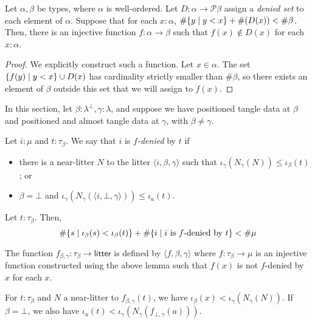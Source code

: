 \documentclass{article}
\begin{document}
\begin{lemma}
    Let \( \alpha, \beta \) be types, where \( \alpha \) is well-ordered.
    Let \( D \colon \alpha \to \mathcal P \beta \) assign a \emph{denied set} to each element of \( \alpha \).
    Suppose that for each \( x : \alpha \), \( \#\qty{y \mid y < x} + \#(D (x)) < \#\beta \).
    Then, there is an injective function \( f \colon \alpha \to \beta \) such that \( f(x) \not\in D(x) \) for each \( x : \alpha \).
\end{lemma}
\begin{proof}
    We explicitly construct such a function.
    Let \( x \in \alpha \).
    The set \( \qty{f(y) \mid y < x} \cup D(x) \) has cardinality strictly smaller than \( \#\beta \), so there exists an element of \( \beta \) outside this set that we will assign to \( f(x) \).
\end{proof}
In this section, let \( \beta : \lambda^\bot, \gamma : \lambda \), and suppose we have positioned tangle data at \( \beta \) and positioned and almost tangle data at \( \gamma \), with \( \beta \neq \gamma \).
\begin{definition}
    Let \( i : \mu \) and \( t : \tau_\beta \).
    We say that \( i \) is \emph{\( f \)-denied} by \( t \) if
    \begin{itemize}
        \item there is a near-litter \( N \) to the litter \( \langle i, \beta, \gamma \rangle \) such that \( \iota_\gamma(N_\gamma(N)) \leq \iota_\beta(t) \); or
        \item \( \beta = \bot \) and \( \iota_\gamma(N_\gamma(\langle i, \bot, \gamma \rangle)) \leq \iota_a(t) \).
    \end{itemize}
\end{definition}
\begin{lemma}
    Let \( t : \tau_\beta \).
    Then,
    \[ \#\qty{s \mid \iota_\beta(s) < \iota_\beta(t)} + \#\qty{i \mid i \text{ is \( f \)-denied by } t} < \#\mu \]
\end{lemma}
\begin{definition}
    The function \( f_{\beta,\gamma} \colon \tau_\beta \to \mathsf{litter} \) is defined by \( \langle f, \beta, \gamma \rangle \) where \( f \colon \tau_\beta \to \mu \) is an injective function constructed using the above lemma such that \( f(x) \) is not \( f \)-denied by \( x \) for each \( x \).
\end{definition}
\begin{lemma}
    For \( t : \tau_\beta \) and \( N \) a near-litter to \( f_{\beta,\gamma}(t) \), we have \( \iota_\beta(x) < \iota_\gamma(N_\gamma(N)) \).
    If \( \beta = \bot \), we also have \( \iota_a(t) < \iota_\gamma(N_\gamma(f_{\bot,\gamma}(a))) \).
\end{lemma}
\end{document}
